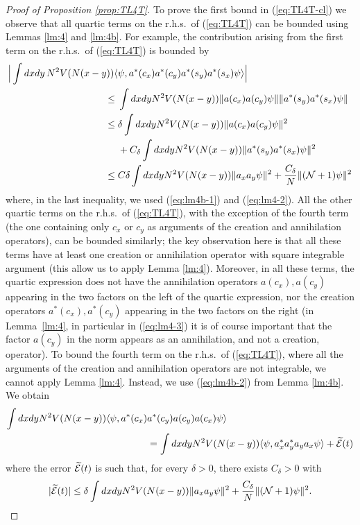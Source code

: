 \documentclass[11pt,a4paper]{article}
\newcommand{\wt}{\widetilde}
\newcommand{\cE}{{\cal E}}
\newcommand{\cN}{{\cal N}}
\begin{document}
\begin{proof}[Proof of Proposition \ref{prop:TL4T}] 
To prove the first bound in (\ref{eq:TL4T-cl}) we observe that all quartic terms on the r.h.s.\ of (\ref{eq:TL4T}) can be bounded using Lemmas \ref{lm:4} and \ref{lm:4b}. For example, the contribution arising from the 
first term on the r.h.s.\ of (\ref{eq:TL4T}) is bounded by
\[ \begin{split} 
\Big| \int dx dy \,  N^2 V (N (x-y)) \langle &\psi ,  a^* (c_x) a^* (c_y) a^* (s_y) a^* (s_x) \psi \rangle \Big| \\\leq \; & \int dx dy N^2 V(N (x-y)) \| a (c_x) a (c_y) \psi \| \| a^* (s_y) a^* (s_x) \psi \| \\
\leq \; & \delta \int dx dy N^2 V (N (x-y)) \| a (c_x) a(c_y) \psi \|^2 \\ &+C_\delta \int dx dy N^2 V(N (x-y)) \| a^* (s_y) a^* (s_x) \psi \|^2 \\
\leq \; & C \delta \int dx dy N^2 V (N (x-y)) \| a_x a_y \psi \|^2 + \frac{C_\delta}{N} \|(\cN+1) \psi \|^2 \end{split} \]
where, in the last inequality, we used (\ref{eq:lm4b-1})  and (\ref{eq:lm4-2}). All the other quartic terms on the r.h.s.\ of (\ref{eq:TL4T}), with the exception of the fourth term (the one containing only $c_x$ or $c_y$ as arguments of the creation and annihilation operators), can be bounded similarly; the key observation here is that all these terms have at least one creation or annihilation operator with square integrable argument (this allow us to apply Lemma \ref{lm:4}). Moreover, in all these terms, the quartic expression does not have the annihilation operators $a(c_x), a(c_y)$ appearing in the two factors on the left of the quartic expression, nor the creation operators $a^* (c_x), a^*  (c_y)$ appearing in the two factors on the right (in Lemma~\ref{lm:4}, in particular in (\ref{eq:lm4-3}) it is of course important that the factor $a(c_y)$ in the norm appears as an annihilation, and not a creation, operator). To bound the fourth term on the r.h.s.\ of (\ref{eq:TL4T}), where all the arguments of the creation and annihilation operators are not integrable, we cannot apply Lemma \ref{lm:4}. Instead, we use (\ref{eq:lm4b-2}) from Lemma \ref{lm:4b}. We obtain
\[ \begin{split}  \int dx dy N^2 V(N(x-y)) \langle \psi, a^* (c_x) &a^* (c_y) a(c_y) a(c_x) \psi \rangle \\ &=  \int dx dy N^2 V(N (x-y)) \langle \psi , a_x^* a_y^* a_y a_x \psi \rangle + \wt{\cE} (t) \end{split} \]
where the error $\wt{\cE} (t)$ is such that, for every $\delta > 0$, there exists $C_\delta >0$ with
\[ |\wt{\cE} (t)| \leq  \delta \int dx dy N^2 V(N (x-y)) \| a_x a_y \psi \|^2 + \frac{C_\delta}{N} \| (\cN+1) \psi \|^2. \]


\end{proof}
\end{document}
